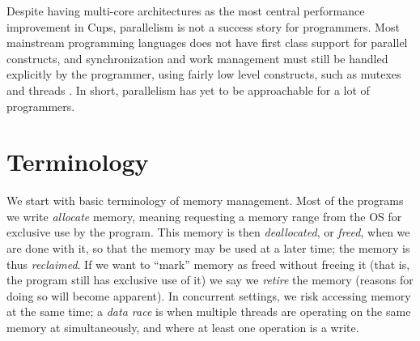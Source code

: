 \documentclass[a4paper,twoside]{report}
\begin{document}
Despite having multi-core architectures as the most central performance
improvement in Cups, parallelism is not a success story for programmers.  Most
mainstream programming languages does not have first class support for parallel
constructs, and synchronization and work management must still be
handled explicitly by the programmer, using fairly low level constructs, such
as mutexes and threads .
In short, parallelism has yet to be approachable for a lot of programmers.


\subsection*{}

\section{Terminology}
We start with basic terminology of memory management.  Most of the programs we
write \emph{allocate} memory, meaning requesting a memory range from the OS for
exclusive use by the program.  This memory is then \emph{deallocated}, or
\emph{freed}, when we are done with it, so that the memory may be used at a
later time; the memory is thus \emph{reclaimed}.  If we want to ``mark'' memory
as freed without freeing it (that is, the program still has exclusive use of
it) we say we \emph{retire} the memory (reasons for doing so will become
apparent).  In concurrent settings, we risk accessing memory at the same time;
a \emph{data race} is when multiple threads are operating on the same memory at
simultaneously, and where at least one operation is a write.
\end{document}
